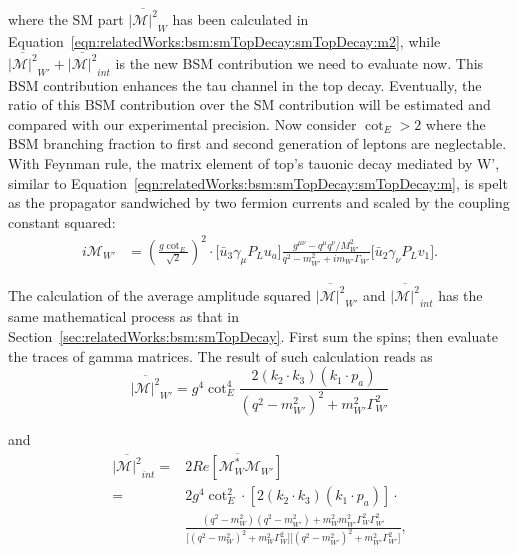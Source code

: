 \noindent where the SM part $\overline{ |\mathcal{M}|^2 } _{W} $  has been calculated in Equation~\ref{eqn:relatedWorks:bsm:smTopDecay:smTopDecay:m2}, while $\overline{ |\mathcal{M}|^2 } _{W'} +  \overline{ |\mathcal{M}|^2 } _{int}$ is the new BSM contribution we need to evaluate now. This BSM contribution enhances the tau channel in the top decay. Eventually, the ratio of this BSM contribution over the SM contribution will be estimated and compared with our experimental precision. Now consider $\cot_E > 2$ where the BSM branching fraction to first and second generation of leptons are neglectable. With Feynman rule, the matrix element of top's tauonic decay mediated by W', similar to Equation~\ref{eqn:relatedWorks:bsm:smTopDecay:smTopDecay:m}, is spelt as the \PWpr propagator sandwiched by two fermion currents and scaled by the coupling constant squared:
\begin{equation}
\begin{split}
	i \mathcal{M}_{W'}  & =  (\frac{g \cot_E}{\sqrt{2}})^2 \cdot 
	\big[ \bar{u}_3 \gamma_\mu P_L u_a \big] 
	\frac{g^{\mu \nu} - q^\mu q^\nu/M^2_{W'}}{q^2-m^2_{W'} + i m_{W'} \Gamma_{W'}} 
	\big[ \bar{u}_2 \gamma_\nu P_L v_1 \big] .
\end{split}
\end{equation}

\noindent The calculation of the average amplitude squared  $\overline{ |\mathcal{M}|^2 } _{W'} $ and $\overline{ |\mathcal{M}|^2 } _{int}$ has the same mathematical process as that in Section~\ref{sec:relatedWorks:bsm:smTopDecay}. First sum the spins; then evaluate the traces of gamma matrices. The result of such calculation reads as
\begin{equation}
	\overline{ |\mathcal{M}|^2 }_{W'} =  g^4 \cot_E^4 \frac{2  (  k_2 \cdot k_3) (  k_1 \cdot p_a) }{ (  q^2-m^2_{W'})^2 +  m^2_{W'} \Gamma^2_{W'} }  
\end{equation}

\noindent and
\begin{equation}
\begin{split}
    \overline{ |\mathcal{M}|^2 } _{int} = &   2 \overline{ Re[\mathcal{M}^*_W \mathcal{M}_{W'}] }  \\
    =& 2 g ^4\cot^2_E  \cdot  [2  (  k_2 \cdot k_3) (  k_1 \cdot p_a) ] \cdot \\
    &\frac 
    {( q^2-m^2_{W}) ( q^2-m^2_{W'}) + m^2_{W}  m^2_{W'}  \Gamma^2_{W} \Gamma^2_{W'} }
    { \big[ ( q^2-m^2_{W})^2 +  m^2_{W} \Gamma^2_{W} \big] \big[ (  q^2-m^2_{W'})^2 +  m^2_{W'} \Gamma^2_{W'} \big] }   
    ,
\end{split}
\end{equation}

